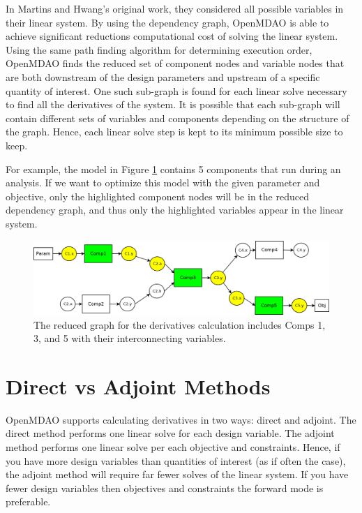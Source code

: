 \documentclass[]{aiaa-tc} %
\begin{document}
    In Martins and Hwang's original work, they considered all possible variables in their linear system. 
    By using the dependency graph, OpenMDAO is able to achieve significant reductions computational cost of 
    solving the linear system. Using the same path finding algorithm for determining execution order, 
    OpenMDAO finds the reduced set of component nodes and variable nodes that are both downstream of the design parameters
    and upstream of a specific quantity of interest. One such sub-graph is found for each linear solve necessary to
    find all the derivatives of the system. It is possible that each sub-graph will contain different sets 
    of variables and components depending on the structure of the graph. Hence, each linear solve step 
    is kept to its minimum possible size to keep. 

    For example, the model in Figure \ref{fig:graph2} contains 5 components that run during an analysis. If we
    want to optimize this model with the given parameter and objective, only the highlighted component nodes
    will be in the reduced dependency graph, and thus only the highlighted variables appear in the linear
    system.
    
    \begin{figure}[!htb]\begin{center}
      \includegraphics[width=.8\textwidth]{images/Graph2}
      \caption{ The reduced graph for the derivatives calculation includes Comps 1, 3, and 5 with their interconnecting variables. \label{fig:graph2}}
    \end{center}\end{figure}

    \section{Direct vs Adjoint Methods}

    OpenMDAO supports calculating derivatives in two ways: direct and adjoint. The direct method performs
    one linear solve for each design variable. The adjoint method performs one linear solve per each objective 
    and constraints. Hence, if you have more design variables than quantities of interest (as if often the case), 
    the adjoint method will require far fewer solves of the linear system. If you have fewer design variables then 
    objectives and constraints the forward mode is preferable. 
\end{document}

